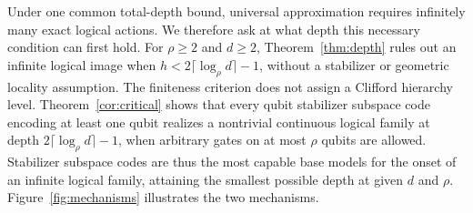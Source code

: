 \documentclass[aps,prl,reprint,notitlepage,nofootinbib,nobibnotes]{revtex4-2}
\begin{document}
Under one common
total-depth bound, universal approximation requires infinitely many
exact logical actions. We therefore ask at what depth this
necessary condition can first hold. For \(\rho\ge2\) and \(d\ge2\),
Theorem~\ref{thm:depth} rules out an infinite logical image when
\(h<2\lceil\log_{\rho} d\rceil-1\), without a stabilizer or geometric locality
assumption. The finiteness criterion does not assign a Clifford
hierarchy level. Theorem~\ref{cor:critical} shows that every qubit stabilizer
subspace code encoding at least one qubit realizes a nontrivial
continuous logical family at depth \(2\lceil\log_{\rho} d\rceil-1\), when
arbitrary gates on at most \(\rho\) qubits are allowed. Stabilizer subspace
codes are thus the most capable base models for the onset of an infinite
logical family, attaining the smallest possible depth at given \(d\)
and \(\rho\).
Figure~\ref{fig:mechanisms} illustrates the two mechanisms.
\end{document}

